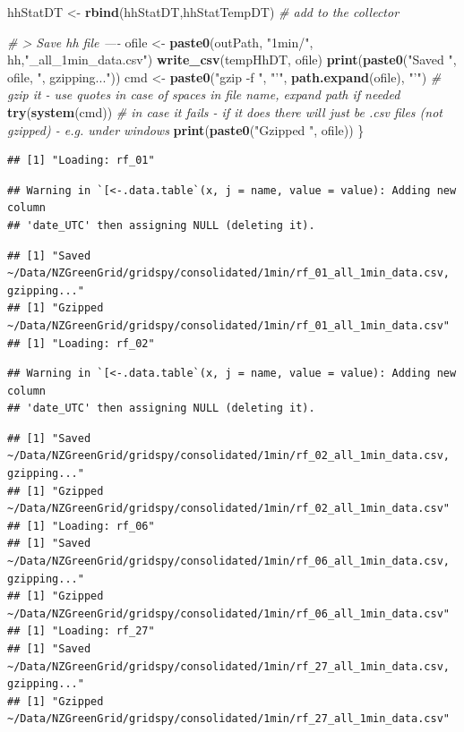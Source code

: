 \documentclass[]{article}
\newenvironment{Shaded}{\begin{snugshade}}{\end{snugshade}}
\newcommand{\KeywordTok}[1]{\textcolor[rgb]{0.13,0.29,0.53}{\textbf{#1}}}
\newcommand{\StringTok}[1]{\textcolor[rgb]{0.31,0.60,0.02}{#1}}
\newcommand{\CommentTok}[1]{\textcolor[rgb]{0.56,0.35,0.01}{\textit{#1}}}
\newcommand{\NormalTok}[1]{#1}
\begin{document}
\begin{Shaded}
\begin{Highlighting}[]
\NormalTok{  hhStatDT <-}\StringTok{ }\KeywordTok{rbind}\NormalTok{(hhStatDT,hhStatTempDT) }\CommentTok{# add to the collector}
  
  \CommentTok{# > Save hh file ----}
\NormalTok{  ofile <-}\StringTok{ }\KeywordTok{paste0}\NormalTok{(outPath, }\StringTok{"1min/"}\NormalTok{, hh,}\StringTok{"_all_1min_data.csv"}\NormalTok{)}
  \KeywordTok{write_csv}\NormalTok{(tempHhDT, ofile)}
  \KeywordTok{print}\NormalTok{(}\KeywordTok{paste0}\NormalTok{(}\StringTok{"Saved "}\NormalTok{, ofile, }\StringTok{", gzipping..."}\NormalTok{))}
\NormalTok{  cmd <-}\StringTok{ }\KeywordTok{paste0}\NormalTok{(}\StringTok{"gzip -f "}\NormalTok{, }\StringTok{"'"}\NormalTok{, }\KeywordTok{path.expand}\NormalTok{(ofile), }\StringTok{"'"}\NormalTok{) }\CommentTok{# gzip it - use quotes in case of spaces in file name, expand path if needed}
  \KeywordTok{try}\NormalTok{(}\KeywordTok{system}\NormalTok{(cmd)) }\CommentTok{# in case it fails - if it does there will just be .csv files (not gzipped) - e.g. under windows}
  \KeywordTok{print}\NormalTok{(}\KeywordTok{paste0}\NormalTok{(}\StringTok{"Gzipped "}\NormalTok{, ofile))}
\NormalTok{\}}
\end{Highlighting}
\end{Shaded}

\begin{verbatim}
## [1] "Loading: rf_01"
\end{verbatim}

\begin{verbatim}
## Warning in `[<-.data.table`(x, j = name, value = value): Adding new column
## 'date_UTC' then assigning NULL (deleting it).
\end{verbatim}

\begin{verbatim}
## [1] "Saved ~/Data/NZGreenGrid/gridspy/consolidated/1min/rf_01_all_1min_data.csv, gzipping..."
## [1] "Gzipped ~/Data/NZGreenGrid/gridspy/consolidated/1min/rf_01_all_1min_data.csv"
## [1] "Loading: rf_02"
\end{verbatim}

\begin{verbatim}
## Warning in `[<-.data.table`(x, j = name, value = value): Adding new column
## 'date_UTC' then assigning NULL (deleting it).
\end{verbatim}

\begin{verbatim}
## [1] "Saved ~/Data/NZGreenGrid/gridspy/consolidated/1min/rf_02_all_1min_data.csv, gzipping..."
## [1] "Gzipped ~/Data/NZGreenGrid/gridspy/consolidated/1min/rf_02_all_1min_data.csv"
## [1] "Loading: rf_06"
## [1] "Saved ~/Data/NZGreenGrid/gridspy/consolidated/1min/rf_06_all_1min_data.csv, gzipping..."
## [1] "Gzipped ~/Data/NZGreenGrid/gridspy/consolidated/1min/rf_06_all_1min_data.csv"
## [1] "Loading: rf_27"
## [1] "Saved ~/Data/NZGreenGrid/gridspy/consolidated/1min/rf_27_all_1min_data.csv, gzipping..."
## [1] "Gzipped ~/Data/NZGreenGrid/gridspy/consolidated/1min/rf_27_all_1min_data.csv"
\end{verbatim}
\end{document}
